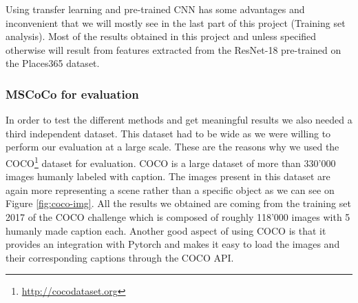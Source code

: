 \documentclass[a4paper]{article}
\begin{document}
Using transfer learning and pre-trained CNN has some advantages and inconvenient that we will mostly see in the last part of this project (Training set analysis). Most of the results obtained in this project and unless specified otherwise will result from features extracted from the ResNet-18 pre-trained on the Places365 dataset.


\subsubsection{MSCoCo for evaluation}

In order to test the different methods and get meaningful results we also needed a third independent dataset. This dataset had to be wide as we were willing to perform our evaluation at a large scale. These are the reasons why we used the COCO\footnote{\url{http://cocodataset.org}} dataset for evaluation. COCO is a large dataset of more than 330'000 images humanly labeled with caption. The images present in this dataset are again more representing a scene rather than a specific object as we can see on Figure \ref{fig:coco-img}. All the results we obtained are coming from the training set 2017 of the COCO challenge which is composed of roughly 118'000 images with 5 humanly made caption each. Another good aspect of using COCO is that it provides an integration with Pytorch and makes it easy to load the images and their corresponding captions through the COCO API.
\end{document}
